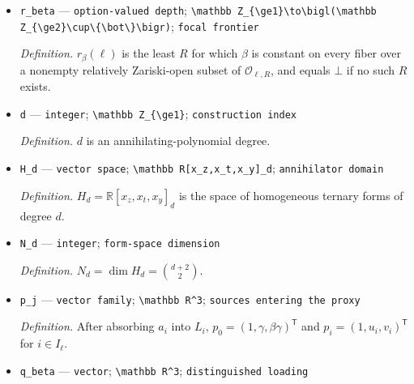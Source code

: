 \documentclass{article}
\begin{document}
\begin{itemize}
  \par\smallskip\noindent\emph{Definition.} For \(\zeta\in\mathcal O_{\ell,R}\), \(F_{\ell,R}(\zeta)=\{\theta\in\Theta_{\ell,R}:\Phi_{\ell,R}(\theta)=\zeta\}\).
  \item \texttt{r\_\allowbreak{}beta} --- \texttt{option-\allowbreak{}valued depth}; \texttt{\textbackslash{}\allowbreak{}mathbb Z\_\allowbreak{}\{\textbackslash{}\allowbreak{}ge1\}\allowbreak{}\textbackslash{}\allowbreak{}to\textbackslash{}\allowbreak{}bigl(\textbackslash{}\allowbreak{}mathbb Z\_\allowbreak{}\{\textbackslash{}\allowbreak{}ge2\}\allowbreak{}\textbackslash{}\allowbreak{}cup\textbackslash{}\allowbreak{}\{\textbackslash{}\allowbreak{}bot\textbackslash{}\allowbreak{}\}\allowbreak{}\textbackslash{}\allowbreak{}bigr)}; \texttt{focal frontier}
  \par\smallskip\noindent\emph{Definition.} \(r_{\beta}(\ell)\) is the least \(R\) for which \(\beta\) is constant on every fiber over a nonempty relatively Zariski-open subset of \(\mathcal O_{\ell,R}\), and equals \(\bot\) if no such \(R\) exists.
  \item \texttt{d} --- \texttt{integer}; \texttt{\textbackslash{}\allowbreak{}mathbb Z\_\allowbreak{}\{\textbackslash{}\allowbreak{}ge1\}\allowbreak{}}; \texttt{construction index}
  \par\smallskip\noindent\emph{Definition.} \(d\) is an annihilating-polynomial degree.
  \item \texttt{H\_\allowbreak{}d} --- \texttt{vector space}; \texttt{\textbackslash{}\allowbreak{}mathbb R[x\_\allowbreak{}z,\allowbreak{}x\_\allowbreak{}t,\allowbreak{}x\_\allowbreak{}y]\_\allowbreak{}d}; \texttt{annihilator domain}
  \par\smallskip\noindent\emph{Definition.} \(H_d=\mathbb R[x_z,x_t,x_y]_d\) is the space of homogeneous ternary forms of degree \(d\).
  \item \texttt{N\_\allowbreak{}d} --- \texttt{integer}; \texttt{form-\allowbreak{}space dimension}
  \par\smallskip\noindent\emph{Definition.} \(N_d=\dim H_d=\binom{d+2}{2}\).
  \item \texttt{p\_\allowbreak{}j} --- \texttt{vector family}; \texttt{\textbackslash{}\allowbreak{}mathbb R\textasciicircum{}3}; \texttt{sources entering the proxy}
  \par\smallskip\noindent\emph{Definition.} After absorbing \(a_i\) into \(L_i\), \(p_0=(1,\gamma,\beta\gamma)^{\mathsf T}\) and \(p_i=(1,u_i,v_i)^{\mathsf T}\) for \(i\in I_{\ell}\).
  \item \texttt{q\_\allowbreak{}beta} --- \texttt{vector}; \texttt{\textbackslash{}\allowbreak{}mathbb R\textasciicircum{}3}; \texttt{distinguished loading}

\end{itemize}
\end{document}
